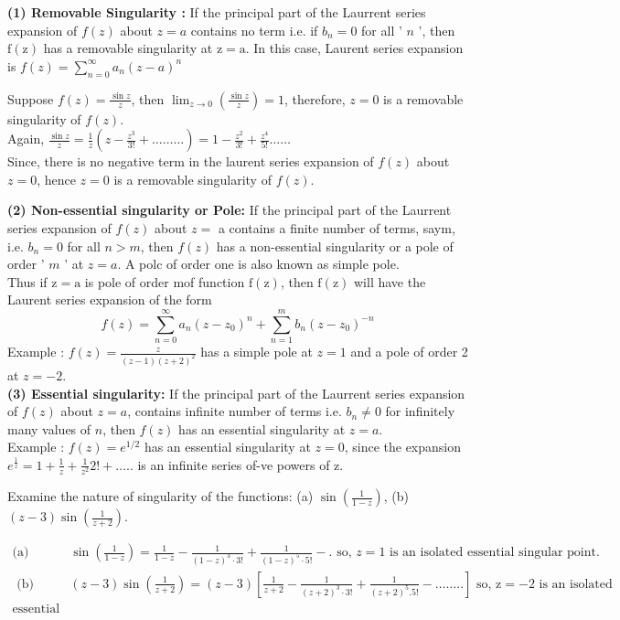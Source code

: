 \textbf{(1) Removable Singularity :} If the principal part of the Laurrent series expansion of $f(z)$ about $z=a$ contains no term i.e. if $b_{n}=0$ for all ' $n$ ', then $\mathrm{f}(\mathrm{z})$ has a removable singularity at $\mathrm{z}=\mathrm{a}$. In this case, Laurent series expansion is $f(z)=\sum_{n=0}^{\infty} a_{n}(z-a)^{n}$
\begin{exercise}
	Suppose $f(z)=\frac{\sin z}{z}$, then $\lim _{z \rightarrow 0}\left(\frac{\sin z}{z}\right)=1$, therefore, $z=0$ is a removable singularity of $f(z)$.\\
	Again, $\frac{\sin z}{z}=\frac{1}{z}\left(z-\frac{z^{3}}{3 !}+\ldots \ldots \ldots\right)=1-\frac{z^{2}}{3 !}+\frac{z^{4}}{5 !} \ldots \ldots$\\
	Since, there is no negative term in the laurent series expansion of $f(z)$ about $z=0$, hence $z=0$ is a removable singularity of $f(z)$.
\end{exercise}
\textbf{(2) Non-essential singularity or Pole:} If the principal part of the Laurrent series expansion of $f(z)$ about $z=$ a contains a finite number of terms, saym, i.e. $b_{n}=0$ for all $n>m$, then $f(z)$ has a non-essential singularity or a pole of order ' $m$ ' at $z=a$. A polc of order one is also known as simple pole.\\
Thus if $\mathrm{z}=\mathrm{a}$ is pole of order mof function $\mathrm{f}(\mathrm{z})$, then $\mathrm{f}(\mathrm{z})$ will have the Laurent series expansion of the form
$$
f(z)=\sum_{n=0}^{\infty} a_{n}\left(z-z_{0}\right)^{n}+\sum_{n=1}^{m} b_{n}\left(z-z_{0}\right)^{-n}
$$
Example : $f(z)=\frac{z}{(z-1)(z+2)^{2}}$ has a simple pole at $z=1$ and a pole of order 2 at $z=-2$.\\
\textbf{(3) Essential singularity: }If the principal part of the Laurrent series expansion of $f(z)$ about $z=a$, contains infinite number of terms i.e. $b_{n} \neq 0$ for infinitely many values of $n$, then $f(z)$ has an essential singularity at $z=a$.\\
Example : $f(z)=e^{1 / 2}$ has an essential singularity at $z=0$, since the expansion $e^{\frac{1}{z}}=1+\frac{1}{z}+\frac{1}{z^{2}} 2 !+\ldots . .$ is an infinite series of-ve powers of $\mathrm{z}$.\\
\begin{exercise}
	Examine the nature of singularity of the functions: (a) $\sin \left(\frac{1}{1-z}\right)$, (b) $(z-3) \sin \left(\frac{1}{z+2}\right)$.
\end{exercise}
\begin{answer}
	\begin{align*}
	\text{(a) }&\sin \left(\frac{1}{1-z}\right)=\frac{1}{1-z}-\frac{1}{(1-z)^{3} \cdot 3 !}+\frac{1}{(1-z)^{5} \cdot 5 !}-.
\text{	so, $z=1$ is an isolated essential singular point.}\\
\text { (b) }&(z-3) \sin \left(\frac{1}{z+2}\right)=(z-3)\left[\frac{1}{z+2}-\frac{1}{(z+2)^{3} \cdot 3 !}+\frac{1}{(z+2)^{5} .5 !}-\ldots \ldots . .\right] \text { so, } \mathrm{z}=-2 \text { is an isolated }\\
\text{essential point}
	\end{align*}
\end{answer}
